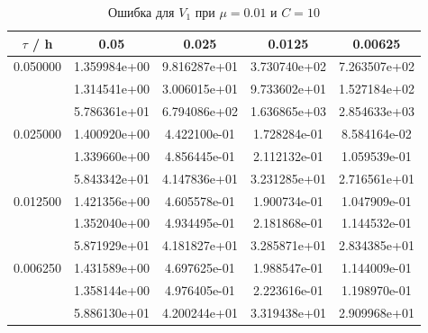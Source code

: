 \documentclass[specialist,subf,href,colorlinks=true,12pt
,times,mtpro,specialist
]{disser}
\begin{document}
\begin{table}[H]
\small
\caption{Ошибка для $V_1$ при $\mu=0.01$ и $C = 10$}
\begin{center}
\begin{tabular}{|c|c|c|c|c|}
\hline
$\tau$ / h & 0.05 & 0.025 & 0.0125 & 0.00625 \\
\hline
0.050000 & 1.359984e+00  & 9.816287e+01  & 3.730740e+02  & 7.263507e+02 \\
 & 1.314541e+00  & 3.006015e+01  & 9.733602e+01  & 1.527184e+02 \\
 & 5.786361e+01  & 6.794086e+02  & 1.636865e+03  & 2.854633e+03 \\
\hline
0.025000 & 1.400920e+00  & 4.422100e-01  & 1.728284e-01  & 8.584164e-02 \\
 & 1.339660e+00  & 4.856445e-01  & 2.112132e-01  & 1.059539e-01 \\
 & 5.843342e+01  & 4.147836e+01  & 3.231285e+01  & 2.716561e+01 \\
\hline
0.012500 & 1.421356e+00  & 4.605578e-01  & 1.900734e-01  & 1.047909e-01 \\
 & 1.352040e+00  & 4.934495e-01  & 2.181868e-01  & 1.144532e-01 \\
 & 5.871929e+01  & 4.181827e+01  & 3.285871e+01  & 2.834385e+01 \\
\hline
0.006250 & 1.431589e+00  & 4.697625e-01  & 1.988547e-01  & 1.144009e-01 \\
 & 1.358144e+00  & 4.976405e-01  & 2.223616e-01  & 1.198970e-01 \\
 & 5.886130e+01  & 4.200244e+01  & 3.319438e+01  & 2.909968e+01 \\
\hline
\end{tabular}
\end{center}
\end{table}
\end{document}
